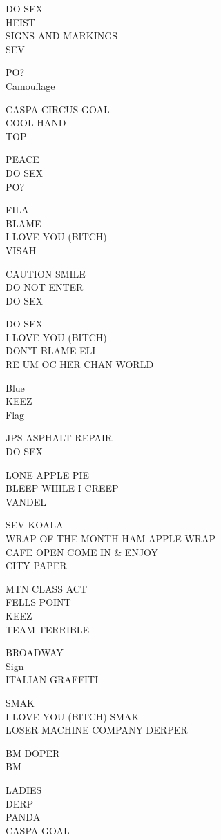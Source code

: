 \documentclass[10pt,letterpaper]{article}
\begin{document}
DO SEX\\
HEIST\\
SIGNS AND MARKINGS\\
SEV

PO?\\
Camouflage

CASPA CIRCUS GOAL\\
COOL HAND\\
TOP

PEACE\\
DO SEX\\
PO?

FILA\\
BLAME\\
I LOVE YOU (BITCH)\\
VISAH

CAUTION SMILE\\
DO NOT ENTER\\
DO SEX

DO SEX\\
I LOVE YOU (BITCH)\\
DON'T BLAME ELI\\
RE UM OC HER CHAN WORLD

Blue\\
KEEZ\\
Flag

JPS ASPHALT REPAIR\\
DO SEX

LONE APPLE PIE\\
BLEEP WHILE I CREEP\\
VANDEL

SEV KOALA\\
WRAP OF THE MONTH HAM APPLE WRAP\\
CAFE OPEN COME IN \& ENJOY\\
CITY PAPER

MTN CLASS ACT\\
FELLS POINT\\
KEEZ\\
TEAM TERRIBLE

BROADWAY\\
Sign\\
ITALIAN GRAFFITI

SMAK\\
I LOVE YOU (BITCH) SMAK\\
LOSER MACHINE COMPANY DERPER

BM DOPER\\
BM

LADIES\\
DERP\\
PANDA\\
CASPA GOAL
\end{document}
